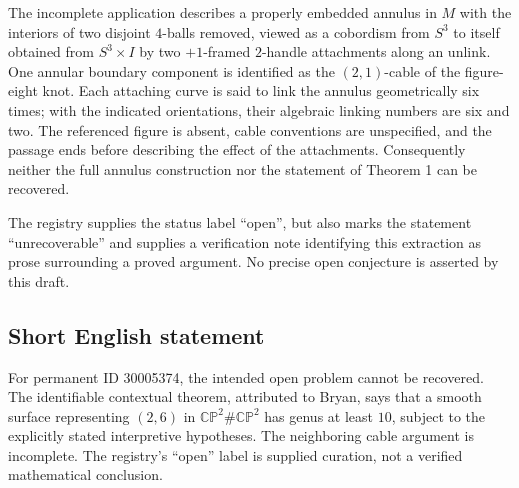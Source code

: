 \documentclass[11pt]{article}
\begin{document}
The incomplete application describes a properly embedded annulus in \(M\) with the interiors of two disjoint \(4\)-balls removed, viewed as a cobordism from \(S^3\) to itself obtained from \(S^3\times I\) by two \(+1\)-framed \(2\)-handle attachments along an unlink. One annular boundary component is identified as the \((2,1)\)-cable of the figure-eight knot. Each attaching curve is said to link the annulus geometrically six times; with the indicated orientations, their algebraic linking numbers are six and two. The referenced figure is absent, cable conventions are unspecified, and the passage ends before describing the effect of the attachments. Consequently neither the full annulus construction nor the statement of Theorem 1 can be recovered.

The registry supplies the status label ``open'', but also marks the statement ``unrecoverable'' and supplies a verification note identifying this extraction as prose surrounding a proved argument. No precise open conjecture is asserted by this draft.
\subsection{Short English statement}
For permanent ID 30005374, the intended open problem cannot be recovered. The identifiable contextual theorem, attributed to Bryan, says that a smooth surface representing \((2,6)\) in \(\mathbb{CP}^{2}\#\mathbb{CP}^{2}\) has genus at least \(10\), subject to the explicitly stated interpretive hypotheses. The neighboring cable argument is incomplete. The registry's ``open'' label is supplied curation, not a verified mathematical conclusion.
\end{document}
